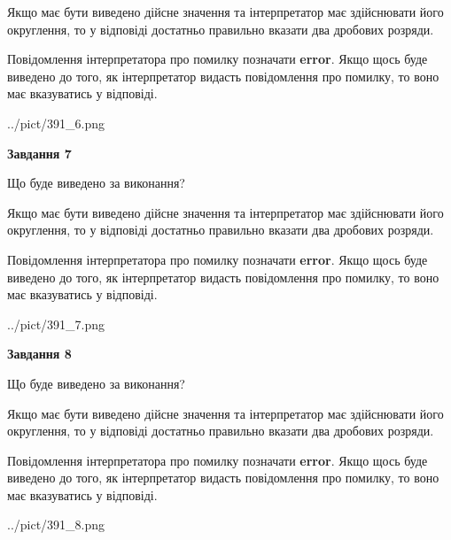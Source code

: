 \documentclass[12pt, ukrainian]{article}
\begin{document}
{\begin {Large}
Якщо має бути виведено дійсне значення та інтерпретатор має здійснювати його округлення, 
то у відповіді достатньо правильно вказати два дробових розряди.

Повідомлення інтерпретатора про помилку позначати \textbf{error}.
Якщо щось буде виведено до того, як інтерпретатор видасть повідомлення про помилку, 
то воно має вказуватись у відповіді. \par

\begin{center}
	{../pict/391_6.png}
\end{center}
\newpage

{\begin {center}\textbf{Завдання 7}\end {center}}\par
Що буде виведено за виконання? \par

Якщо має бути виведено дійсне значення та інтерпретатор має здійснювати його округлення, 
то у відповіді достатньо правильно вказати два дробових розряди.

Повідомлення інтерпретатора про помилку позначати \textbf{error}.
Якщо щось буде виведено до того, як інтерпретатор видасть повідомлення про помилку, 
то воно має вказуватись у відповіді. \par

\begin{center}
	{../pict/391_7.png}
\end{center}
\newpage

{\begin {center}\textbf{Завдання 8}\end {center}}\par
Що буде виведено за виконання? \par

Якщо має бути виведено дійсне значення та інтерпретатор має здійснювати його округлення, 
то у відповіді достатньо правильно вказати два дробових розряди.

Повідомлення інтерпретатора про помилку позначати \textbf{error}.
Якщо щось буде виведено до того, як інтерпретатор видасть повідомлення про помилку, 
то воно має вказуватись у відповіді. \par

\begin{center}
	{../pict/391_8.png}
\end{center}
\newpage


\end{Large}}
\end{document}

